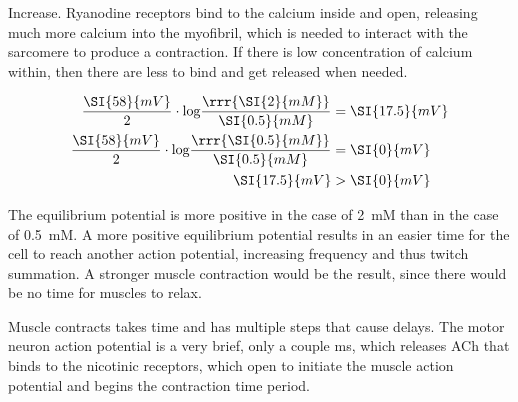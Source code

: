 \documentclass[basic]{inVerba-notes}
\begin{document}
\begin{enumerate}

  Increase. Ryanodine receptors bind to the calcium inside and open, releasing much more calcium into the myofibril, which is needed to interact with the sarcomere to produce a contraction. If there is low concentration of calcium within, then there are less to bind and get released when needed.

  \begin{align*}
    \frac{\SI{58}{mV}}{2}\cdot \text{log}\frac{\rrr{\SI{2}{mM}}}{\SI{0.5}{mM}}&=\SI{17.5}{mV} \\ 
    \frac{\SI{58}{mV}}{2}\cdot \text{log}\frac{\rrr{\SI{0.5}{mM}}}{\SI{0.5}{mM}}&=\SI{0}{mV} \\ 
    \SI{17.5}{mV} &> \SI{0}{mV} 
  \end{align*}

  The equilibrium potential is more positive in the case of \SI{2}{mM} than in the case of \SI{0.5}{mM}. A more positive equilibrium potential results in an easier time for the cell to reach another action potential, increasing frequency and thus twitch summation. A stronger muscle contraction would be the result, since there would be no time for muscles to relax.



  Muscle contracts takes time and has multiple steps that cause delays. The motor neuron action potential is a very brief, only a couple ms, which releases ACh that binds to the nicotinic receptors, which open to initiate the muscle action potential and begins the contraction time period.


\end{enumerate}
\end{document}
